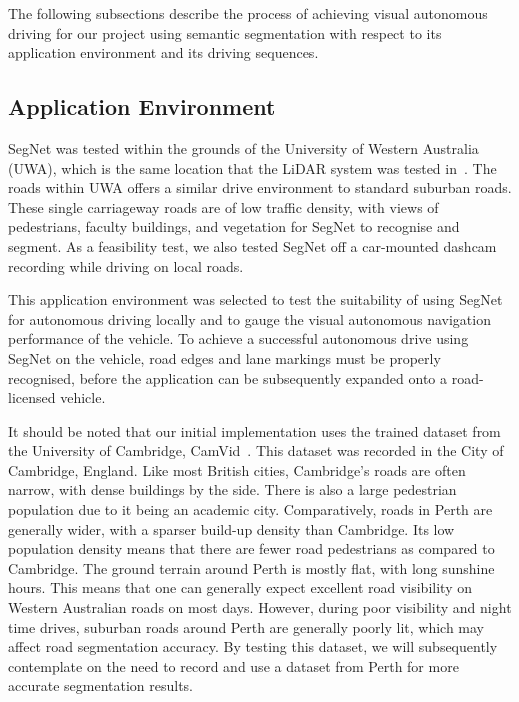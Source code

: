 The following subsections describe the process of achieving visual autonomous driving for our project using semantic segmentation with respect to its application environment and its driving sequences.

\subsection{Application Environment}
SegNet was tested within the grounds of the University of Western Australia (UWA), which is the same location that the LiDAR system was tested in~\cite{drage_lidar_2015}. The roads within UWA offers a similar drive environment to standard suburban roads. These single carriageway roads are of low traffic density, with views of pedestrians, faculty buildings, and vegetation for SegNet to recognise and segment. As a feasibility test, we also tested SegNet off a car-mounted dashcam recording while driving on local roads. 

This application environment was selected to test the suitability of using SegNet for autonomous driving locally and to gauge the visual autonomous navigation performance of the vehicle. To achieve a successful autonomous drive using SegNet on the vehicle, road edges and lane markings must be properly recognised, before the application can be subsequently expanded onto a road-licensed vehicle.

It should be noted that our initial implementation uses the trained dataset from the University of Cambridge, CamVid~\cite{badrinarayanan_segnet:_2017}. This dataset was recorded in the City of Cambridge, England. Like most British cities, Cambridge's roads are often narrow, with dense buildings by the side. There is also a large pedestrian population due to it being an academic city. Comparatively, roads in Perth are generally wider, with a sparser build-up density than Cambridge. Its low population density means that there are fewer road pedestrians as compared to Cambridge. The ground terrain around Perth is mostly flat, with long sunshine hours. This means that one can generally expect excellent road visibility on Western Australian roads on most days. However, during poor visibility and night time drives, suburban roads around Perth are generally poorly lit, which may affect road segmentation accuracy. By testing this dataset, we will subsequently contemplate on the need to record and use a dataset from Perth for more accurate segmentation results.

